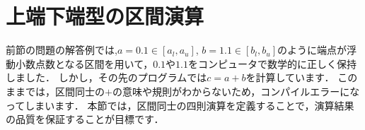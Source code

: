%
\section{上端下端型の区間演算} \label{intval}
前節の問題の解答例では,$a = 0.1 \in[a_l, a_u]$, $b = 1.1 \in [b_l, b_u]$のように端点が浮動小数点数となる区間を用いて，$0.1$や$1.1$をコンピュータで数学的に正しく保持しました．
しかし，その先のプログラムでは$c = a + b$を計算しています．
このままでは，区間同士の$+$の意味や規則がわからないため，コンパイルエラーになってしまいます．
本節では，区間同士の四則演算を定義することで，演算結果の品質を保証することが目標です．

